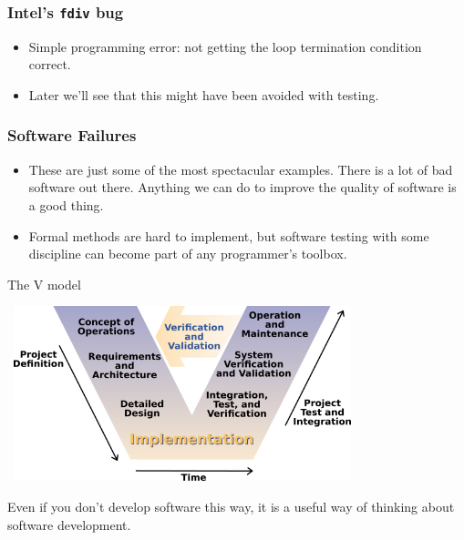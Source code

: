 \documentclass{beamer}
\begin{document}
\begin{frame}
  \frametitle{Intel's {\tt fdiv} bug}
  \begin{itemize}
  \item Simple programming error: not getting the loop termination
    condition correct.
  \item Later we'll see that this might have been avoided with testing.
  \end{itemize}
\end{frame}
\begin{frame}
  \frametitle{Software Failures}
  \begin{itemize}
  \item These are just some of the most spectacular examples. There is
    a lot of bad software out there. Anything we can do to
    improve the quality of software is a good thing. 
  \item  Formal methods are hard to implement, but
    software testing with some discipline can become part of any
    programmer's toolbox.
  \end{itemize}
\end{frame}
\begin{frame}{The V model}
\begin{center} 
 \includegraphics[height=2in,width=4in]{V_model.png}
\end{center}
Even if you don't develop software this way, it is a useful way of
thinking about software development.
\end{frame}
\end{document}
